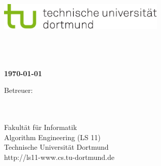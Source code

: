 \begin{titlepage}
\vspace*{-2cm}
\newlength{\links}
\setlength{\links}{-1.5cm}
\sf
\LARGE

\hspace*{\links}
\begin{minipage}{12.5cm}
\includegraphics[width=8cm]{bilder/tulogo-rgb}
\end{minipage}

\author{Henri Johannes Lübeck}

\vspace*{4cm}

\hspace*{\links}
\hspace*{-0.2cm}
\begin{minipage}{8.5cm}
\large
\begin{center}
{\Large \MeineArbeit} \\
\vspace*{1cm}
\bf{ \MeinTitel } \\
\vspace*{1.5cm}
\MeinVorame \MeinNachname\\
\today
\end{center}
\end{minipage}

\vspace*{3.7cm}

\hspace*{\links}

\vspace*{1.5cm}

\vspace*{.6cm}

\hspace*{\links}
\begin{minipage}[b]{5cm}
\normalsize
\raggedright
Betreuer: \\
\Erstbetreuer \\
\Zweitbetreuer \\
\end{minipage}

\vspace*{2.5cm}
\hspace*{\links}
\begin{minipage}[b]{8cm}
\normalsize
\raggedright
Fakultät für Informatik\\
Algorithm Engineering (LS 11)\\
Technische Universität Dortmund \\
http://ls11-www.cs.tu-dortmund.de
\end{minipage}


\end{titlepage}
